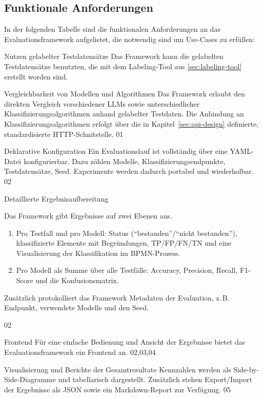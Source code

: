 \subsection*{Funktionale Anforderungen}

In der folgenden Tabelle sind die funktionalen Anforderungen an das Evaluationsframework aufgelistet, die notwendig sind um Use-Cases zu erfüllen:

\begin{center}
    {Nutzen gelabelter Testdatensätze}
    {Das Framework kann die gelabelten Testdatensätze benutzten, die mit dem Labeling-Tool aus \ref{sec:labeling-tool} erstellt worden sind.}
    {}
\end{center}

\begin{center}
    {Vergleichbarkeit von Modellen und Algorithmen}
    {Das Framework erlaubt den direkten Vergleich verschiedener \acp{LLM} sowie unterschiedlicher Klassifizierungsalgorithmen anhand gelabelter Testdaten. Die Anbindung an Klassifizierungsalgorithmen erfolgt über die in Kapitel~\ref{sec:api-design} definierte, standardisierte HTTP-Schnitstelle.}
    {01}
\end{center}

\begin{center}
    {Deklarative Konfiguration}
    {Ein Evaluationslauf ist vollständig über eine YAML-Datei konfigurierbar. Dazu zöhlen Modelle, Klassifizierungsendpunkte, Testdatensätze, Seed. Experimente werden dadurch portabel und wiederholbar.}
    {02}
\end{center}

\begin{center}
    {Detaillierte Ergebnisaufbereitung}
    {
    Das Framework gibt Ergebnisse auf zwei Ebenen aus.
    \begin{enumerate}
        \item Pro Testfall und pro Modell: Status (\enquote{bestanden}/\enquote{nicht bestanden}), klassifizierte Elemente mit Begründungen, \ac{TP}/\ac{FP}/\ac{FN}/\ac{TN} und eine Visualisierung der Klassifikation im \ac{BPMN}-Prozess.
        \item Pro Modell als Summe über alle Testfälle: Accuracy, Precision, Recall, F1-Score und die Konfusionsmatrix.
    \end{enumerate}
    Zusätzlich protokolliert das Framework Metadaten der Evaluation, z.\,B. Endpunkt, verwendete Modelle und den Seed.
    }
    {02}
\end{center}

\begin{center}
    {Frontend}
    {Für eine einfache Bedienung und Ansicht der Ergebnisse bietet das Evaluationsframework ein Frontend an.}
    {02,03,04}
\end{center}

\begin{center}
    {Visualisierung und Berichte der Gesamtresultate}
    {Kennzahlen werden als Side-by-Side-Diagramme und tabellarisch dargestellt. Zusätzlich stehen Export/Import der Ergebnisse als JSON sowie ein Markdown-Report zur Verfügung.}
    {05}
\end{center}